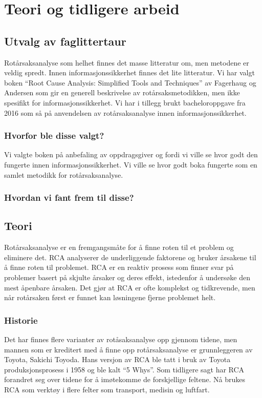\chapter{Teori og tidligere arbeid}
\label{kap:teori}

\section{Utvalg av faglittertaur}
Rotårsaksanalyse som helhet finnes det masse litteratur om, men metodene er veldig spredt. Innen informasjonssikkerhet finnes det lite litteratur. Vi har valgt boken ``Root Cause Analysis: Simplified Tools and Techniques'' av Fagerhaug og Andersen \cite{RCA} som gir en generell beskrivelse av rotårsaksmetodikken, men ikke spesifikt for informasjonssikkerhet. Vi har i tillegg brukt bacheloroppgave fra 2016 \cite{RCARapport} som så på anvendelsen av rotårsaksanalyse innen informasjonssikkerhet.

\subsection{Hvorfor ble disse valgt?}
Vi valgte boken \cite{RCA} på anbefaling av oppdragsgiver og fordi vi ville se hvor godt den fungerte innen informasjonssikkerhet. Vi ville se hvor godt boka fungerte som en samlet metodikk for rotårsaksanalyse. 

\subsection{Hvordan vi fant frem til disse?}


\section{Teori}
Rotårsaksanalyse er en fremgangsmåte for å finne roten til et problem og eliminere det. RCA analyserer de underliggende faktorene og bruker årsakene til å finne roten til problemet. RCA er en reaktiv prosess som finner svar på problemer basert på skjulte årsaker og deres effekt, istedenfor å undersøke den mest åpenbare årsaken. Det gjør at RCA er ofte komplekst og tidkrevende, men når rotårsaken først er funnet kan løsningene fjerne problemet helt. 

\subsection{Historie}
Det har finnes flere varianter av rotåsaksanalyse opp gjennom tidene, men mannen som er kreditert med å finne opp rotårsaksanalyse er grunnleggeren av Toyota, Sakichi Toyoda. Hans versjon av RCA ble tatt i bruk av Toyota produksjonsprosess i 1958 og ble kalt ``5 Whys''. Som tidligere sagt har RCA forandret seg over tidene for å imøtekomme de forskjellige feltene. Nå brukes RCA som verktøy i flere felter som transport, medisin og luftfart\cite{Teori}. 
    
